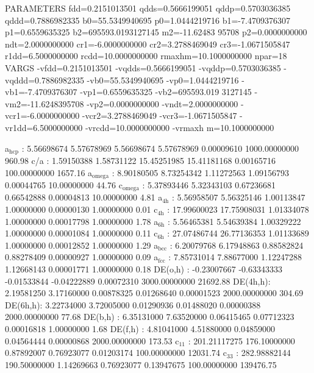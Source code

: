 \documentclass[11pt]{article}
\begin{document}
PARAMETERS
  fdd=0.2151013501 qdds=0.5666199051 qddp=0.5703036385 qddd=0.7886982335 b0=55.5349940695 p0=1.0444219716 b1=-7.4709376307 p1=0.6559635325 b2=695593.0193127145 m2=-11.62483
95708 p2=0.0000000000 ndt=2.0000000000 cr1=-6.0000000000 cr2=3.2788469049 cr3=-1.0671505847 r1dd=6.5000000000 rcdd=10.0000000000 rmaxhm=10.1000000000 npar=18 
VARGS
    -vfdd=0.2151013501 -vqdds=0.5666199051 -vqddp=0.5703036385 -vqddd=0.7886982335 -vb0=55.5349940695 -vp0=1.0444219716 -vb1=-7.4709376307 -vp1=0.6559635325 -vb2=695593.019
3127145 -vm2=-11.6248395708 -vp2=0.0000000000 -vndt=2.0000000000 -vcr1=-6.0000000000 -vcr2=3.2788469049 -vcr3=-1.0671505847 -vr1dd=6.5000000000 -vrcdd=10.0000000000 -vrmaxh
m=10.1000000000 

a\(_{\text{hcp}}\)   :   5.56698674   5.57678969   5.56698674   5.57678969   0.00009610 1000.00000000       960.98
c/a     :   1.59150388   1.58731122  15.45251985  15.41181168   0.00165716 100.00000000      1657.16
a\(_{\text{omega}}\) :   8.90180505   8.73254342   1.11272563   1.09156793   0.00044765  10.00000000        44.76
c\(_{\text{omega}}\) :   5.37893446   5.32343103   0.67236681   0.66542888   0.00004813  10.00000000         4.81
a\(_{\text{4h}}\)    :   5.56958507   5.56325146   1.00113847   1.00000000   0.00000130   1.00000000         0.01
c\(_{\text{4h}}\)    :  17.99600023  17.75908031   1.01334078   1.00000000   0.00017798   1.00000000         1.78
a\(_{\text{6h}}\)    :   5.56465381   5.54639384   1.00329222   1.00000000   0.00001084   1.00000000         0.11
c\(_{\text{6h}}\)    :  27.07486744  26.77136353   1.01133689   1.00000000   0.00012852   1.00000000         1.29
a\(_{\text{bcc}}\)   :   6.20079768   6.17948863   0.88582824   0.88278409   0.00000927   1.00000000         0.09
a\(_{\text{fcc}}\)   :   7.85731014   7.88677000   1.12247288   1.12668143   0.00001771   1.00000000         0.18
DE(o,h) :  -0.23007667  -0.63343333  -0.01533844  -0.04222889   0.00072310 3000.00000000     21692.88
DE(4h,h):   2.19581250   3.17160000   0.00878325   0.01268640   0.00001523 2000.00000000       304.69
DE(6h,h):   3.22734000   3.72005000   0.01290936   0.01488020   0.00000388 2000.00000000        77.68
DE(b,h) :   6.35131000   7.63520000   0.06415465   0.07712323   0.00016818   1.00000000         1.68
DE(f,h) :   4.81041000   4.51880000   0.04859000   0.04564444   0.00000868 2000.00000000       173.53
c\(_{\text{11}}\)    : 201.21117275 176.10000000   0.87892007   0.76923077   0.01203174 100.00000000     12031.74
c\(_{\text{33}}\)    : 282.98882144 190.50000000   1.14269663   0.76923077   0.13947675 100.00000000    139476.75
\end{document}

